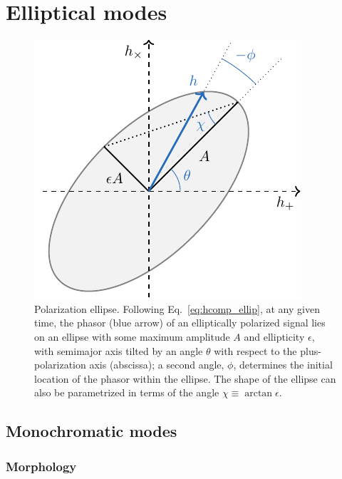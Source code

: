 \documentclass[aps,prd,twocolumn,superscriptaddress,preprintnumbers,floatfix,nofootinbib]{revtex4-2}
\newcommand*{\eq}[1]{Eq.~\eqref{eq:#1}}
\begin{document}
\section{Elliptical modes}
\label{sec:ellip_modes}

\begin{figure}
\includegraphics[width=0.65\columnwidth]{diagram_ellipse.pdf}
\caption{Polarization ellipse. Following \eq{hcomp_ellip}, at any given time, the phasor (blue arrow) of an elliptically polarized signal lies on an ellipse with some maximum amplitude $A$ and ellipticity $\epsilon$, with semimajor axis tilted by an angle $\theta$ with respect to the plus-polarization axis (abscissa); a second angle, $\phi$, determines the initial location of the phasor within the ellipse.
The shape of the ellipse can also be parametrized in terms of the angle $\chi \equiv \arctan \epsilon$.
}
\label{fig:ellipse}
\end{figure}

\subsection{Monochromatic modes}
\label{sec:ellip:mono}

\subsubsection{Morphology}
\label{sec:ellip:mono:morph}
\end{document}

